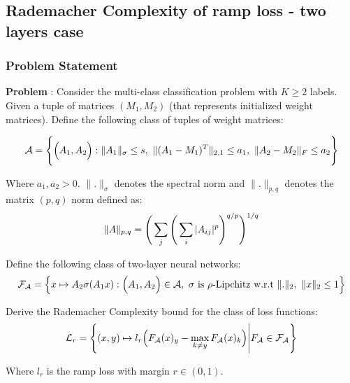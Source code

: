 \newpage
\subsection{Rademacher Complexity of ramp loss - two layers case}
\subsubsection{Problem Statement}
\textbf{Problem} : Consider the multi-class classification problem with $K \ge 2$ labels. Given a tuple of matrices $(M_1, M_2)$ (that represents initialized weight matrices). Define the following class of tuples of weight matrices:

\begin{align*}
    \mathcal{A} = \Bigg\{ 
        \Big( 
            A_1, A_2
         \Big) : \|A_1\|_\sigma \le s, \ \| (A_1 - M_1)^T \|_{2, 1} \le a_1, \ \| A_2 - M_2 \|_F \le a_2
     \Bigg\}
\end{align*}

\noindent Where $a_1, a_2 > 0$. $\|.\|_\sigma$ denotes the spectral norm and $\|.\|_{p, q}$ denotes the matrix $(p, q)$ norm defined as:
\begin{align*}
    \|A\|_{p, q} = \Bigg( \sum_j\Bigg( \sum_{i}|A_{ij}|^p \Bigg)^{q/p} \Bigg)^{1/q}
\end{align*}    

\noindent Define the following class of two-layer neural networks:
\begin{align*}
    \F_\mathcal{A} = \bigCurl{
        x\mapsto A_2\sigma(A_1x) : \bigRound{A_1, A_2}\in\mathcal{A}, \ \sigma \text{ is } \rho\text{-Lipchitz w.r.t } \|.\|_2, \ \|x\|_2 \le 1
    }
\end{align*}

\noindent Derive the Rademacher Complexity bound for the class of loss functions:
\begin{align*}
    \mathcal{L}_r = \Bigg\{ 
        (x, y) \mapsto l_r\Big( 
            F_\mathcal{A}(x)_y - \max_{k\ne y}F_\mathcal{A}(x)_k
         \Big) \Bigg| F_\mathcal{A} \in \mathcal{F}_\mathcal{A}
     \Bigg\}
\end{align*}

\noindent Where $l_r$ is the ramp loss with margin $r\in(0,1)$.

